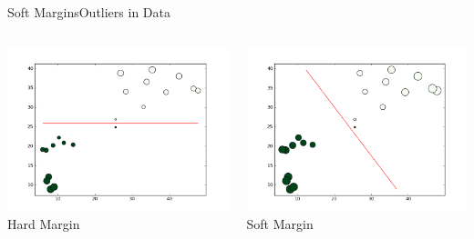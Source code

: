 \documentclass[xcolor=dvipsnames]{beamer}
\begin{document}
\begin{frame}{Soft Margins}{Outliers in Data}
    \begin{columns}
        \begin{column}{0.5\textwidth}
            \begin{center}
                \includegraphics[width=\textwidth]{figs/outlier_hard.png}\\
                Hard Margin
            \end{center}
        \end{column}
        \begin{column}{0.5\textwidth}
            \begin{center}
                \includegraphics[width=\textwidth]{figs/outlier_soft.png}\\
                Soft Margin
            \end{center}
        \end{column}
    \end{columns}
\end{frame}
\end{document}
